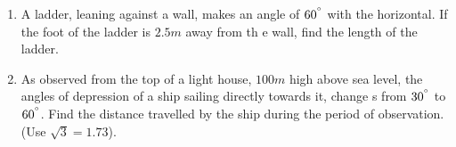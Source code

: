 \documentclass{article}
\begin{document}
   
	\begin{enumerate}
\item A ladder, leaning against a wall, makes an angle of $60^{\degree}$ with the horizontal. If the foot of the ladder is $2.5m$ away from th    e wall, find the length of the ladder.

 \item As observed from the top of a light house, $100 m$  high above sea level, the angles of depression of a ship sailing directly towards it, change    s from $30^{\degree}$ to $60^{\degree}$. Find the distance travelled by the ship during the period of observation. (Use $\sqrt{3} = 1.73$).

\end{enumerate}
\end{document}
